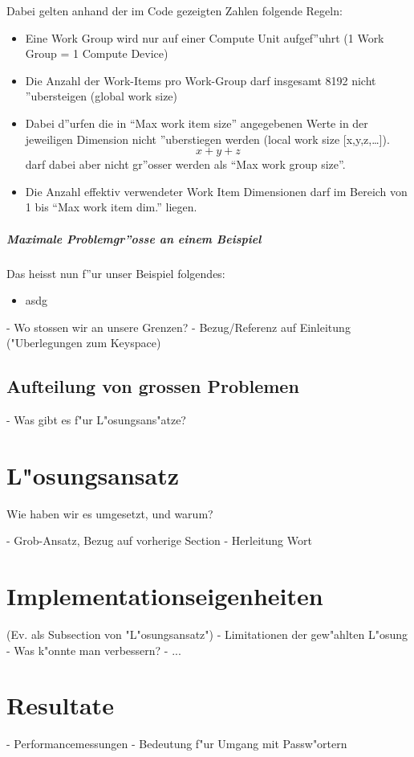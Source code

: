 \begin{refsection}
\begin{description}
\end{description}


Dabei gelten anhand der im Code gezeigten Zahlen folgende Regeln:\cite{crypto:opencl_ref}
\begin{itemize}
 \item Eine Work Group wird nur auf einer Compute Unit aufgef''uhrt (1 Work Group = 1 
       Compute Device) 
 \item Die Anzahl der Work-Items pro Work-Group darf insgesamt 8192 nicht ''ubersteigen (global work size)
 \item Dabei d''urfen die in ``Max work item size'' angegebenen Werte in der jeweiligen 
       Dimension nicht ''uberstiegen werden (local work size [x,y,z,\ldots]). \[x+y+z\] 
       darf dabei aber nicht gr''osser werden als ``Max work group size''.
 \item Die Anzahl effektiv verwendeter Work Item Dimensionen darf im Bereich von 1 bis
       ``Max work item dim.'' liegen.
\end{itemize}


\subparagraph{Maximale Problemgr''osse an einem Beispiel}

Das heisst nun f''ur unser Beispiel folgendes:

\begin{itemize}
 \item asdg
\end{itemize}








- Wo stossen wir an unsere Grenzen?
- Bezug/Referenz auf Einleitung ("Uberlegungen zum Keyspace)

\subsection{Aufteilung von grossen Problemen}

- Was gibt es f"ur L"osungsans"atze?




\section{L"osungsansatz}

Wie haben wir es umgesetzt, und warum?

- Grob-Ansatz, Bezug auf vorherige Section
- Herleitung Wort

\section{Implementationseigenheiten}

(Ev. als Subsection von "L"osungsansatz")
- Limitationen der gew"ahlten L"osung
- Was k"onnte man verbessern?
- ...

\section{Resultate}

- Performancemessungen
- Bedeutung f"ur Umgang mit Passw"ortern

\printbibliography[heading=subbibliography]
\end{refsection}
